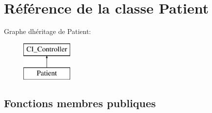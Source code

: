 \hypertarget{class_patient}{}\section{Référence de la classe Patient}
\label{class_patient}
Graphe d\textquotesingle{}héritage de Patient\+:\begin{figure}[H]
\begin{center}
\leavevmode
\includegraphics[height=2.000000cm]{class_patient}
\end{center}
\end{figure}
\subsection*{Fonctions membres publiques}
